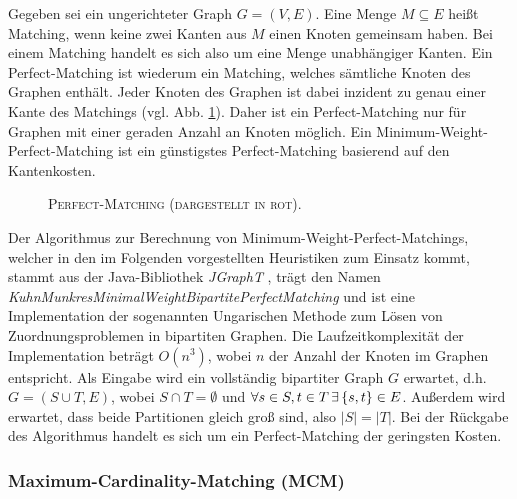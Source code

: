 Gegeben sei ein ungerichteter Graph $G = (V, E)$. Eine Menge $M \subseteq E$ heißt Matching,
wenn keine zwei Kanten aus $M$ einen Knoten gemeinsam haben. Bei einem Matching handelt es sich also
um eine Menge unabhängiger Kanten. Ein Perfect-Matching ist wiederum ein Matching, welches sämtliche Knoten des Graphen enthält.
Jeder Knoten des Graphen ist dabei inzident zu genau einer Kante des Matchings (vgl. Abb. \ref{fig:perfect_matching}).
Daher ist ein Perfect-Matching nur für Graphen mit einer geraden Anzahl an Knoten möglich.
Ein Minimum-Weight-Perfect-Matching ist ein günstigstes Perfect-Matching basierend auf den Kantenkosten.
\begin{figure}[H]
\centering
{}
\caption{\textsc{Perfect-Matching (dargestellt in rot).}}
\label{fig:perfect_matching}
\end{figure}

Der Algorithmus zur Berechnung von Minimum-Weight-Perfect-Matchings, welcher in den im Folgenden
vorgestellten Heuristiken zum Einsatz kommt, stammt aus der Java-Bibliothek \textit{JGraphT} \cite{JGraphT}, trägt
den Namen \textit{KuhnMunkresMinimalWeightBipartitePerfectMatching} und ist eine Implementation der
sogenannten Ungarischen Methode zum Lösen von Zuordnungsproblemen in bipartiten Graphen.
Die Laufzeitkomplexität der Implementation beträgt $O(n^3)$, wobei $n$ der Anzahl der Knoten im Graphen entspricht.
Als Eingabe wird ein vollständig bipartiter Graph $G$ erwartet, d.h. $G= (S \cup T, E)$, wobei $S \cap T = \emptyset$ und
$\forall s \in S, t \in T \thinspace \exists \thinspace \{s, t\} \in E$. Außerdem wird erwartet, dass beide Partitionen gleich groß sind,
also $|S| = |T|$. Bei der Rückgabe des Algorithmus handelt es sich um ein Perfect-Matching der geringsten Kosten.

\subsubsection{Maximum-Cardinality-Matching (MCM)}
\label{sec:digression_mcm}

